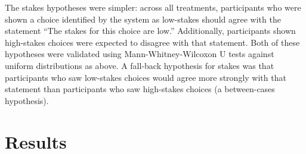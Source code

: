 The stakes hypotheses were simpler: across all treatments, participants who were shown a choice identified by the system as low-stakes should agree with the statement ``The stakes for this choice are low.''
%
Additionally, participants shown high-stakes choices were expected to disagree with that statement.
%
Both of these hypotheses were validated using Mann-Whitney-Wilcoxon U tests against uniform distributions as above.
%
A fall-back hypothesis for stakes was that participants who saw low-stakes choices would agree more strongly with that statement than participants who saw high-stakes choices (a between-cases hypothesis).


\section{Results}

\label{sec:e1-results}

